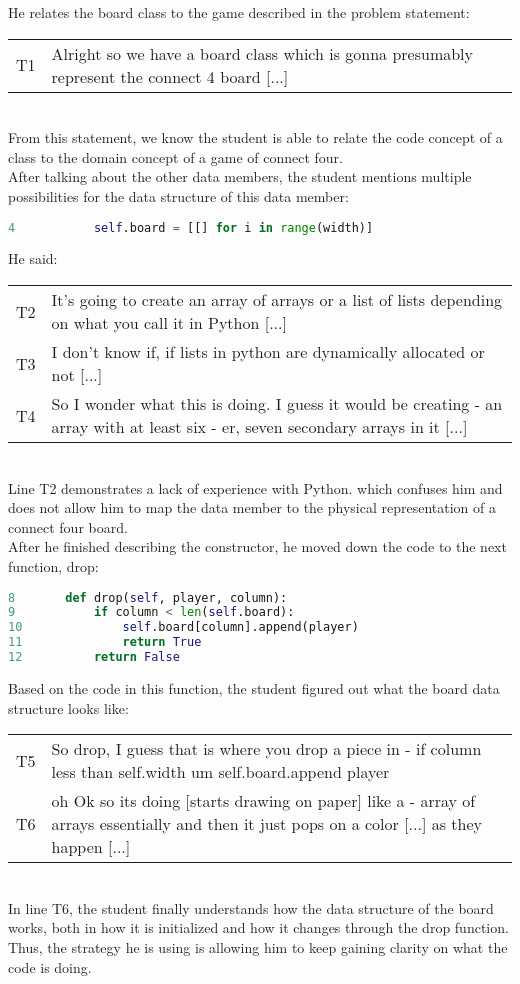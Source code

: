He relates the board class to the game described in the problem statement: \\
\begin{tabular}{lp{13cm}}
T1& Alright so we have a board class which is gonna presumably represent the connect 4 board [...]\\
\end{tabular} \\
From this statement, we know the student is able to relate the code concept of a class to the domain concept of a game of connect four. \\

After talking about the other data members, the student mentions multiple possibilities for the data structure of this data member:
\begin{lstlisting}[language=python]
4 			self.board = [[] for i in range(width)]
\end{lstlisting}

He said: \\
\begin{tabular}{lp{13cm}}
T2& It's going to create an array of arrays or a list of lists depending on what you call it in Python [...] \\
T3& I don't know if, if lists in python are dynamically allocated or not [...] \\
T4& So I wonder what this is doing. I guess it would be creating - an array with at least six - er, seven secondary arrays in it [...]\\
\end{tabular}\\
Line T2 demonstrates a lack of experience with Python.  which confuses him and does not allow him to map the data member to the physical representation of a connect four board. \\


After he finished describing the constructor, he moved down the code to the next function, drop:
\begin{lstlisting}[language=python]
8 		def drop(self, player, column):
9 			if column < len(self.board):
10				self.board[column].append(player)
11				return True
12			return False
\end{lstlisting} 

Based on the code in this function, the student figured out what the board data structure looks like: \\
\begin{tabular}{lp{13cm}}
T5& So drop, I guess that is where you drop a piece in - if column less than self.width um self.board.append player \\
T6&oh Ok so its doing  [starts drawing on paper] like a - array of arrays essentially and then it just pops on a color [...] as they happen [...] \\
\end{tabular}\\
In line T6, the student finally understands how the data structure of the board works, both in how it is initialized and how it changes through the drop function. Thus, the strategy he is using is allowing him to keep gaining clarity on what the code is doing. \\

